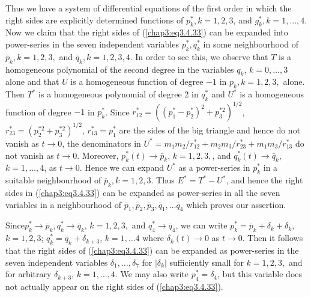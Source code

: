 Thus we have a system of differential equations of the first order in
which the right sides are explicitly determined functions of $p^*_k, k
= 1,2,3$, and $g^*_k,k=1,\ldots, 4$. Now we claim that the right sides
of (\ref{chap3:eq3.4.33}) can be expanded into power-series in the
seven independent variables $p^*_k, q^*_k$ in some neighbourhood of
$\bar{p}_k, k =1,2,3,$ and $\bar{q}_k, k = 1,2,3,4$. In order to see
this, we observe that $T$ is a homogeneous polynomial of the second
degree in the variables $q_k$, $k = 0, \ldots, 3$ alone and that $U$
is a homogeneous function of degree $-1$ in $p_k, k = 1,2,3,$
alone. Then $T^*$ is a homogeneous polynomial of degree 2 in $q^*_k$
and $U^*$ is a homogeneous function of degree $-1$ in $p^*_k$. Since
$r^*_{12} = ((p^*_1 - p^*_2)^2 + p^{*2}_3)^{1/2} $, $r^*_{23} =
(p^{*2}_2 + p^{*2}_3)^{1/2}$, $r^*_{13} = p^*_1$ are the sides of the
big triangle and hence do not vanish as $t \to 0$, the denominators in
$U^* = m_1 m_2/ r^*_{12} + m_2 m_3 / r^*_{23} + m_1 m_3 / r^*_{13}$ do
not vanish as $t \to 0$. Moreover, $p^*_k (t) \to \bar{p}_k$, $k
=1,2,3,$, and $q^*_k(t) \to \bar{q}_k$, $k =1, \ldots, 4$, as $t \to
0$. Hence we can expand $U^*$ as a power-series in $p^*_k$ in a
suitable neighbourhood of $\bar{p}_k, k =1,2,3$. Thus $E^* = T^* -
U^*$, and hence the right sides in (\ref{chap3:eq3.4.33}) can be
expanded as power-series in all the seven variables in a neighbourhood
of $\bar{p}_1, \bar{p}_2, \bar{p}_3, \bar{q}_1, \ldots \bar{q}_4$
which proves our assertion. 

Since\pageoriginale $p^*_k \to \bar{p}_k, q^*_k \to \bar{q}_k$, $k =
1,2,3,$ and $q^*_4 \to \bar{q}_4$, we can write $p^*_k = \bar{p}_k +
\delta_k + \delta_k$, $k =1,2,3$; $q^*_k = \bar{q}_k + \delta_{k+3}$,
$k=1, \ldots 4$ where $\delta_k(t) \to 0$ as $t \to 0$. Then it
follows that the right sides of (\ref{chap3:eq3.4.33}) can be expanded
as power-series in the seven independent variables $\delta_1, \ldots,
\delta_7$ for $|\delta_k|$ sufficiently small for $k = 1,2,3,$ and for
arbitrary $\delta_{k+3}$, $k =1,\ldots, 4$. We may also write $p^*_4 =
\delta_4$, but this variable does not actually appear on the right
sides of (\ref{chap3:eq3.4.33}). 

